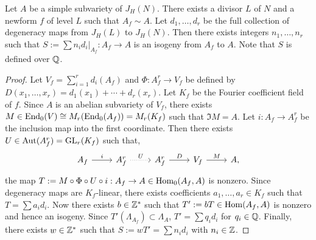 \documentclass{article}
\begin{document}
\begin{proposition}
    \label{prop:integral_degen}
    Let $A$ be a simple subvariety of $J_H(N)$. There exists a divisor $L$ of
    $N$ and a newform $f$ of level $L$ such that $A_f \sim A$. Let
    $d_1,\ldots,d_r$ be the full collection of degeneracy maps from $J_H(L)$ to
    $J_H(N)$. Then there exists integers $n_1,\ldots,n_r$ such that $S:=\sum
    n_i d_i|_{A_f}: A_f\to A$ is an isogeny from $A_f$ to $A$. Note that $S$ is
    defined over $\mathbb{Q}$.
\end{proposition}
\begin{proof}
    Let $V_f=\sum_{i=1} ^r d_i(A_f)$ and $\Phi:A_f ^r \to V_f$ be defined by
    $D(x_1,\ldots,x_r) = d_1(x_1)+\cdots+d_r(x_r)$. Let $K_f$ be the Fourier
    coefficient field of $f$. Since $A$ is an abelian subvariety of $V_f$, there
    exists $M\in \operatorname{End}_0(V)\cong M_r(\operatorname{End}_0(A_f)) = M_r (K_f)$ such that $\Im M
    = A$. Let $i:A_f\to A_f ^r$ be the inclusion map into the first coordinate.
    Then there exists $U\in \operatorname{Aut}(A_f ^r)=\operatorname{GL}_r (K_f)$ such that,
    \[
        \begin{tikzcd}
            A_f \arrow[r,"i"] &
            A_f ^r \arrow[r, dotted, "U"] &
            A_f ^r \arrow[r, "D"] &
            V_f \arrow[r, "M"] &
            A,
        \end{tikzcd}
    \]
    the map $T:=M \circ \Phi \circ U\circ i:A_f\to A\in \operatorname{Hom}_0(A_f, A)$ is
    nonzero. Since degeneracy maps are $K_f$-linear, there exists coefficients
    $a_1,\ldots,a_r\in K_f$ such that $T = \sum a_i d_i$. Now there exists
    $b\in \mathbb{Z}^*$ such that $T':=bT\in \operatorname{Hom}(A_f, A)$ is nonzero and hence an
    isogeny. Since $T'(\Lambda_{A_f})\subset \Lambda_A$, $T'=\sum q_i d_i$
    for $q_i\in \mathbb{Q}$. Finally, there exists $w\in \mathbb{Z}^*$ such that
    $S:=wT'=\sum n_i d_i$ with $n_i\in \mathbb{Z}$.
\end{proof}

\end{document}
